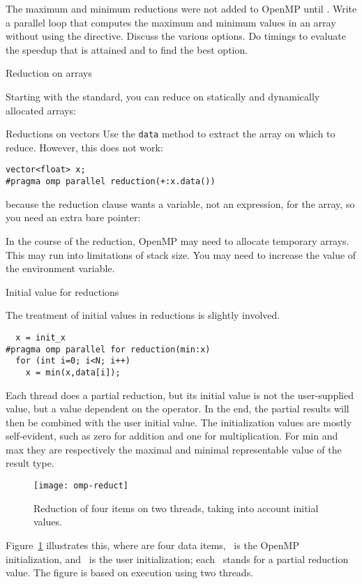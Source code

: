\begin{exercise}
  The maximum and minimum reductions were not added to OpenMP until
  .
  Write a parallel loop that computes the maximum and
  minimum values in an array without using the  directive.
  Discuss the various options. Do timings
  to evaluate the speedup that is attained and to find the best option.
\end{exercise}

 {Reduction on arrays}
\label{sec:omp-array-reduct}

Starting with the  standard, you can reduce
on statically and dynamically allocated arrays:

\begin{cppnote}{Reductions on vectors}
  Use the \lstinline{data} method to extract the array
  on which to reduce. However, this does not work:
\begin{lstlisting}
vector<float> x;
#pragma omp parallel reduction(+:x.data())
\end{lstlisting}
  because the reduction clause wants a variable, not an expression,
  for the array, so you need an extra bare pointer:
\end{cppnote}

In the course of the reduction, OpenMP may need to allocate
temporary arrays. This may run into limitations of stack size.
You may need to increase the value of the 
environment variable.

 {Initial value for reductions}

The treatment of initial values in reductions is slightly involved.
\begin{lstlisting}
  x = init_x
#pragma omp parallel for reduction(min:x)
  for (int i=0; i<N; i++)
    x = min(x,data[i]);
\end{lstlisting}
Each thread does a partial reduction, but its initial value is not the
user-supplied  value, but a value dependent on the
operator. In the end, the partial results will then be combined with
the user initial value.
The initialization values are mostly self-evident, such as zero for
addition and one for multiplication. For min and max they are
respectively the maximal and minimal representable value of the result type.

\begin{figure}[ht]
  \texttt{[image: omp-reduct]}
  \caption{Reduction of four items on two threads, taking into account
    initial values.}
  \label{fig:omp-reduct}  
\end{figure}
%
Figure~\ref{fig:omp-reduct} illustrates this, where  are
four data items, ~is the OpenMP initialization, and ~is the
user initialization; each ~stands for a partial reduction value.
The figure is based on execution using two threads.

